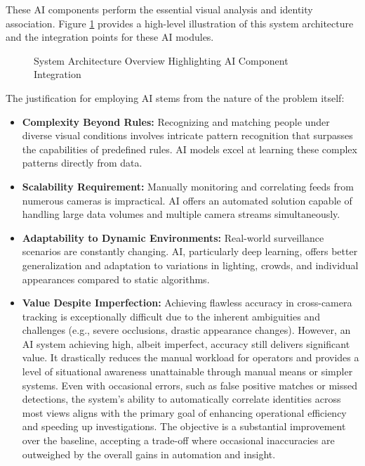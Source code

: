 These AI components perform the essential visual analysis and identity association. Figure \ref{fig:system_architecture} provides a high-level illustration of this system architecture and the integration points for these AI modules.
\begin{figure}[!htb] %
    \centering

    \caption{System Architecture Overview Highlighting AI Component Integration}
    \label{fig:system_architecture} %
\end{figure}
\clearpage %
The justification for employing AI stems from the nature of the problem itself:
\begin{itemize}
    \item \textbf{Complexity Beyond Rules:} Recognizing and matching people under diverse visual conditions involves intricate pattern recognition that surpasses the capabilities of predefined rules. AI models excel at learning these complex patterns directly from data.
    \item \textbf{Scalability Requirement:} Manually monitoring and correlating feeds from numerous cameras is impractical. AI offers an automated solution capable of handling large data volumes and multiple camera streams simultaneously.
    \item \textbf{Adaptability to Dynamic Environments:} Real-world surveillance scenarios are constantly changing. AI, particularly deep learning, offers better generalization and adaptation to variations in lighting, crowds, and individual appearances compared to static algorithms.
    \item \textbf{Value Despite Imperfection:} Achieving flawless accuracy in cross-camera tracking is exceptionally difficult due to the inherent ambiguities and challenges (e.g., severe occlusions, drastic appearance changes). However, an AI system achieving high, albeit imperfect, accuracy still delivers significant value. It drastically reduces the manual workload for operators and provides a level of situational awareness unattainable through manual means or simpler systems. Even with occasional errors, such as false positive matches or missed detections, the system's ability to automatically correlate identities across most views aligns with the primary goal of enhancing operational efficiency and speeding up investigations. The objective is a substantial improvement over the baseline, accepting a trade-off where occasional inaccuracies are outweighed by the overall gains in automation and insight.
\end{itemize}

